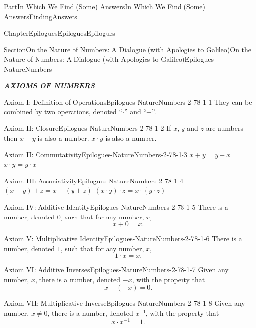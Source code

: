 \documentclass[oneside,10pt,]{book}
\newcommand{\alert}[1]{\textbf{\textit{#1}}}
\numberwithin{equation}{part}
\begin{document}
\begin{partptx}{Part}{In Which We Find (Some) Answers}{}{In Which We Find (Some) Answers}{}{}{FindingAnswers}
\begin{chapterptx}{Chapter}{Epilogues}{}{Epilogues}{}{}{Epilogues}
\begin{sectionptx}{Section}{On the Nature of Numbers: A Dialogue (with Apologies to Galileo)}{}{On the Nature of Numbers: A Dialogue (with Apologies to Galileo)}{}{}{Epilogues-NatureNumbers}
\begin{introduction}{}
\par
\alert{AXIOMS OF NUMBERS}%
\par
%
\begin{descriptionlist}
\begin{dlimedium}{Axiom I: Definition of Operations}{Epilogues-NatureNumbers-2-78-1-1}%
They can be combined by two operations, denoted ``\(\cdot\)'' and ``+''.%
\end{dlimedium}%
\begin{dlimedium}{Axiom II: Closure}{Epilogues-NatureNumbers-2-78-1-2}%
If \(x\), \(y\) and \(z\) are numbers then \(x+y\) is also a number. \(x\cdot y\) is also a number.%
\end{dlimedium}%
\begin{dlimedium}{Axiom II: Commutativity}{Epilogues-NatureNumbers-2-78-1-3}%
\(x+y=y+x\) \(x\cdot y=y\cdot x\)%
\end{dlimedium}%
\begin{dlimedium}{Axiom III: Associativity}{Epilogues-NatureNumbers-2-78-1-4}%
\((x+y)+z=x+(y+z)\) \((x\cdot y)\cdot z = x\cdot(y\cdot z)\)%
\end{dlimedium}%
\begin{dlimedium}{Axiom IV: Additive Identity}{Epilogues-NatureNumbers-2-78-1-5}%
There is a number, denoted \(0\), such that for any number, \(x\),%
\begin{equation*}
x+0=x\text{.}
\end{equation*}
%
\end{dlimedium}%
\begin{dlimedium}{Axiom V: Multiplicative Identity}{Epilogues-NatureNumbers-2-78-1-6}%
There is a number, denoted \(1\), such that for any number, \(x\),%
\begin{equation*}
1\cdot x=x\text{.}
\end{equation*}
%
\end{dlimedium}%
\begin{dlimedium}{Axiom VI: Additive Inverses}{Epilogues-NatureNumbers-2-78-1-7}%
Given any number, \(x\), there is a number, denoted \(-x\), with the property that%
\begin{equation*}
x+(-x)=0\text{.}
\end{equation*}
%
\end{dlimedium}%
\begin{dlimedium}{Axiom VII: Multiplicative Inverse}{Epilogues-NatureNumbers-2-78-1-8}%
Given any number, \(x\ne0\), there is a number, denoted \(x^{-1}\), with the property that%
\begin{equation*}
x\cdot x^{-1} =1\text{.}

\end{equation*}
\end{dlimedium}
\end{descriptionlist}
\end{introduction}
\end{sectionptx}
\end{chapterptx}
\end{partptx}
\end{document}
